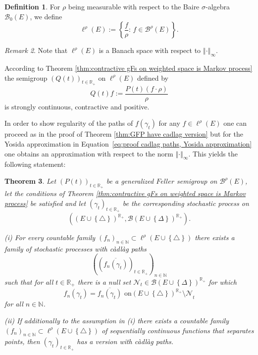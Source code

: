 \documentclass[a4paper,12pt]{article}
\newtheorem{theorem}{Theorem}[section]
\theoremstyle{definition}
\newtheorem{definition}[theorem]{Definition}
\theoremstyle{remark}
\newtheorem{remark}[theorem]{Remark}
\numberwithin{equation}{section}
\numberwithin{theorem}{section}
\begin{document}
\begin{definition}\label{ellrho}
\label{def:l-rho}
For $\rho$ being measurable with respect to the Baire $\sigma$-algebra $\mathcal{B}_0(E)$, we define
\[
\ell^{\rho}(E):=\left\{ \frac{f}{\rho}:\,f\in\mathcal{\mathscr{B}}^{\rho}(E)\right\} .
\]
\end{definition}

\begin{remark}
Note that $\ell^{\rho}(E)$ is a 
Banach space
with respect to $\left\Vert \cdot\right\Vert _{\infty}.$
\end{remark}

According to Theorem \ref{thm:contractive gFs on weighted space is Markov process}
the semigroup $\left(Q(t)\right)_{t\in\mathbb{R}_{+}}$ on $\ell^{\rho}(E)$ defined by $$Q(t)f:=\frac{P(t)\left(f\cdot\rho\right)}{\rho}$$ is strongly continuous, contractive and positive.


In order to show regularity of the paths of $f(\gamma_{t})$ for any $f\in\ell^{\rho}(E)$ one can proceed as in the proof of Theorem \ref{thm:GFP have cadlag version} but for the Yosida approximation in Equation~\eqref{eq:proof cadlag paths, Yosida approximation} one obtains an approximation with respect to the norm $\left\Vert \cdot\right\Vert _{\infty}$. This yields the following statement: 

\begin{theorem}
\label{thm:GFP have cadlag version-1}Let $\left(P(t)\right)_{t\in\mathbb{R}_{+}}$
be a generalized $Feller$ semigroup on $\mathcal{\mathscr{B}}^{\rho}(E)$,
let the conditions of Theorem \ref{thm:contractive gFs on weighted space is Markov process}
be satisfied and let $\left(\gamma_{t}\right)_{t\in\mathbb{R}_{+}}$
be the corresponding stochastic process on 
\[
\left(\left(E\cup\left\{ \triangle\right\} \right)^{\mathbb{R}_{+}},\mathcal{B}(E\cup\left\{ \Delta\right\} )^{\mathbb{R}_{+}}\right).
\]

(i) For every countable family  $\left(f_{n}\right)_{n\in\mathbb{N}}\subset\ell^{\rho}(E\cup\left\{ \triangle\right\} )$
there exists a family of stochastic processes with càdlàg 
paths 
\[
\left(\left(\overline{f_{n}(\gamma_{t})}\right)_{t\in\mathbb{R}_{+}}\right)_{n\in\mathbb{N}}
\]
 such that for all $t\in\mathbb{R}_{+}$ there is a null set $\mathcal{N}{}_{t}\in\mathcal{B}(E\cup\left\{ \Delta\right\} )^{\mathbb{R}_{+}}$
for which 
\[
f_{n}(\gamma_{t})=\overline{f_{n}(\gamma_{t})}\text{ on}\left(E\cup\left\{ \triangle\right\} \right)^{\mathbb{R}_{+}}\mathcal{\setminus N}_{t}
\]
 for all $n\in\mathbb{N}$. 

(ii) If additionally to the assumption in (i) there exists a countable
family $\left(f_{n}\right)_{n\in\mathbb{N}}\subset\ell^{\rho}(E\cup\left\{ \triangle\right\} )$
of sequentially continuous functions that separates points, then $\left(\gamma_{t}\right)_{t\in\mathbb{R}_{+}}$
has a version with càdlàg paths.
\end{theorem}
\end{document}
